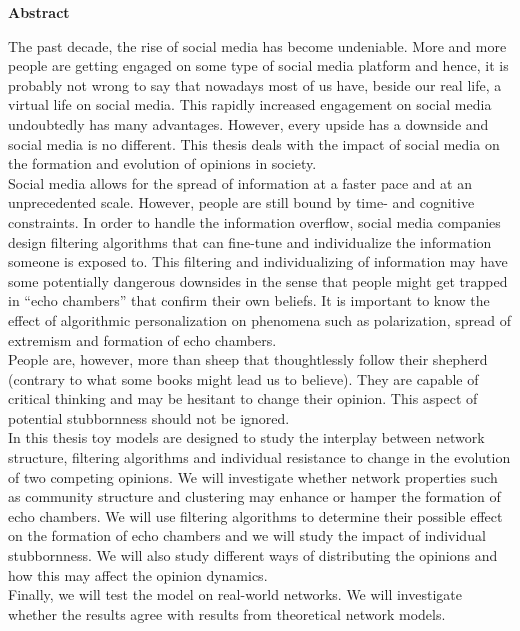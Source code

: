 \documentclass[11 pt , letterpaper , twoside , openright]{book}
\newenvironment{abstract}%
{\cleardoublepage\null \vfill\begin{center}\bfseries \abstractname \end{center}}{\vfill\null}
\begin{document}
\renewcommand{\abstractname}{Abstract}
\begin{abstract}
\thispagestyle{plain}
\setcounter{page}{\value{abstractpage}}

\noindent
The past decade, the rise of social media has become undeniable. More and more people are getting engaged on some type of social media platform and hence, it is probably not wrong to say that nowadays most of us have, beside our real life, a virtual life on social media. This rapidly increased engagement on social media undoubtedly has many advantages. However, every upside has a downside and social media is no different. This thesis deals with the impact of social media on the formation and evolution of opinions in society.\\ 
\newline
Social media allows for the spread of information at a faster pace and at an unprecedented scale. However, people are still bound by time- and cognitive constraints. In order to handle the information overflow, social media companies design filtering algorithms that can fine-tune and individualize the information someone is exposed to. This filtering and individualizing of information may have some potentially dangerous downsides in the sense that people might get trapped in ``echo chambers'' that confirm their own beliefs. It is important to know the effect of algorithmic personalization on phenomena such as polarization, spread of extremism and formation of echo chambers.\\
\newline
People are, however, more than sheep that thoughtlessly follow their shepherd (contrary to what some books might lead us to believe). They are capable of critical thinking and may be hesitant to change their opinion. This aspect of potential stubbornness should not be ignored.\\
\newline
In this thesis toy models are designed to study the interplay between network structure, filtering algorithms and individual resistance to change in the evolution of two competing opinions. We will investigate whether network properties such as community structure and clustering may enhance or hamper the formation of echo chambers. We will use filtering algorithms to determine their possible effect on the formation of echo chambers and we will study the impact of individual stubbornness. We will also study different ways of distributing the opinions and how this may affect the opinion dynamics. \\
\newline
Finally, we will test the model on real-world networks. We will investigate whether the results agree with results from theoretical network models.

\setcounter{abstractpage}{\value{page}}
\end{abstract}
\end{document}
